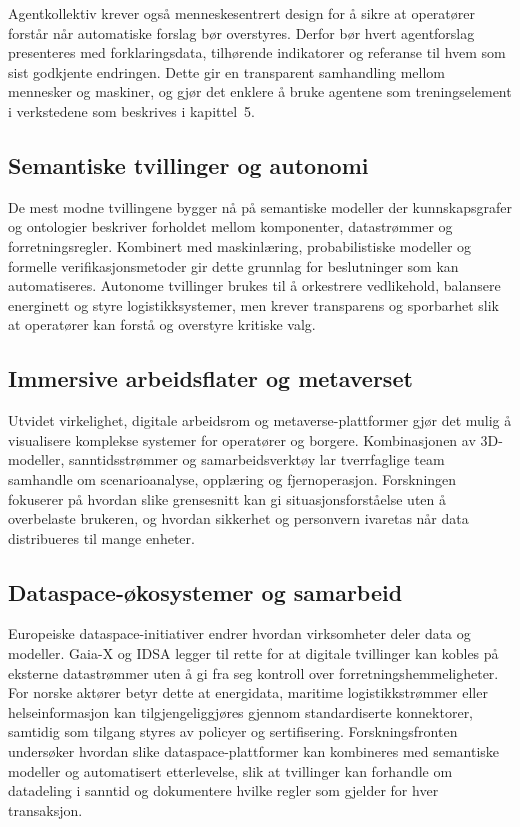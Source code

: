 Agentkollektiv krever også menneskesentrert design for å sikre at operatører forstår når automatiske forslag bør overstyres. Derfor bør hvert agentforslag presenteres med forklaringsdata, tilhørende indikatorer og referanse til hvem som sist godkjente endringen. Dette gir en transparent samhandling mellom mennesker og maskiner, og gjør det enklere å bruke agentene som treningselement i verkstedene som beskrives i kapittel~5.

\subsection{Semantiske tvillinger og autonomi}
De mest modne tvillingene bygger nå på semantiske modeller der kunnskapsgrafer og ontologier beskriver forholdet mellom komponenter, datastrømmer og forretningsregler. Kombinert med maskinlæring, probabilistiske modeller og formelle verifikasjonsmetoder gir dette grunnlag for beslutninger som kan automatiseres. Autonome tvillinger brukes til å orkestrere vedlikehold, balansere energinett og styre logistikksystemer, men krever transparens og sporbarhet slik at operatører kan forstå og overstyre kritiske valg.

\subsection{Immersive arbeidsflater og metaverset}
Utvidet virkelighet, digitale arbeidsrom og metaverse-plattformer gjør det mulig å visualisere komplekse systemer for operatører og borgere. Kombinasjonen av 3D-modeller, sanntidsstrømmer og samarbeidsverktøy lar tverrfaglige team samhandle om scenarioanalyse, opplæring og fjernoperasjon. Forskningen fokuserer på hvordan slike grensesnitt kan gi situasjonsforståelse uten å overbelaste brukeren, og hvordan sikkerhet og personvern ivaretas når data distribueres til mange enheter.

\subsection{Dataspace-økosystemer og samarbeid}
Europeiske dataspace-initiativer endrer hvordan virksomheter deler data og modeller. Gaia-X og IDSA legger til rette for at digitale tvillinger kan kobles på eksterne datastrømmer uten å gi fra seg kontroll over forretningshemmeligheter.\citep{gaiax2022architecture,idsa2023ram} For norske aktører betyr dette at energidata, maritime logistikkstrømmer eller helseinformasjon kan tilgjengeliggjøres gjennom standardiserte konnektorer, samtidig som tilgang styres av policyer og sertifisering. Forskningsfronten undersøker hvordan slike dataspace-plattformer kan kombineres med semantiske modeller og automatisert etterlevelse, slik at tvillinger kan forhandle om datadeling i sanntid og dokumentere hvilke regler som gjelder for hver transaksjon.

